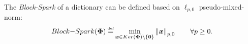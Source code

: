 \begin{Mydefinition}[\myhl{$\boldsymbol{\myBSpkTxt}$}]
\label{def:Block Spark}
\leftbar
The \emph{Block-Spark} of a dictionary can be defined based on $\ell_{p,0}$ pseudo-mixed-norm:
\begin{equation*}
\begin{aligned}
\label{eq:Block Spark}
\myBSpkMath &\myeq \min_{\boldsymbol{x} \in \myKerMath\backslash\left\{\boldsymbol{0}\right\}} \mynorm{\boldsymbol x}_{p,0} \qquad \forall p \geq 0. \\
\end{aligned}
\end{equation*}
\endleftbar
\end{Mydefinition}